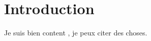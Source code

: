 \section*{Introduction}
\label{sec:introduction}

Je suis bien content \cite{pessia_evidence_2012}, je peux citer des choses. 